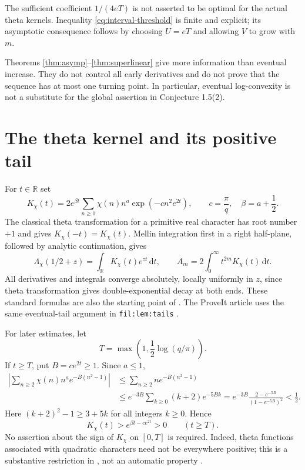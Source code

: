 \documentclass[11pt]{article}
\newcommand{\dd}{\,\mathrm d}
\newcommand{\R}{\mathbb R}
\begin{document}
The sufficient coefficient $1/(4eT)$ is not asserted to be optimal for the actual theta kernels. Inequality \eqref{eq:interval-threshold} is finite and explicit; its asymptotic consequence follows by choosing $U=eT$ and allowing $V$ to grow with $m$.

Theorems \ref{thm:asymp}--\ref{thm:superlinear} give more information than eventual increase. They do not control all early derivatives and do not prove that the sequence has at most one turning point. In particular, eventual log-convexity is not a substitute for the global assertion in Conjecture 1.5(2).

\section{The theta kernel and its positive tail}
For $t\in\R$ set
\[
 K_\chi(t)=2e^{\beta t}\sum_{n\ge1}\chi(n)n^a
 \exp\!\left(-c n^2e^{2t}\right),
 \qquad c=\frac\pi q,\quad\beta=a+\frac12.
\]
The classical theta transformation for a primitive real character has root number $+1$ and gives $K_\chi(-t)=K_\chi(t)$. Mellin integration first in a right half-plane, followed by analytic continuation, gives
\begin{equation}\label{eq:kernel}
 \Lambda_\chi(1/2+z)=\int_{\R}K_\chi(t)e^{zt}\dd t,
 \qquad
 A_m=2\int_0^\infty t^{2m}K_\chi(t)\dd t.
\end{equation}
All derivatives and integrals converge absolutely, locally uniformly in $z$, since theta transformation gives double-exponential decay at both ends. These standard formulas are also the starting point of \cite{SV}. The ProveIt article uses the same eventual-tail argument in \texttt{fil:lem:tails} \cite{ProveIt}.

For later estimates, let
\[
 T=\max\left(1,\frac12\log(q/\pi)\right).
\]
If $t\ge T$, put $B=ce^{2t}\ge1$. Since $a\le1$,
\begin{align*}
 \left|\sum_{n\ge2}\chi(n)n^a e^{-B(n^2-1)}\right|
 &\le\sum_{n\ge2}n e^{-B(n^2-1)}\\
 &\le e^{-3B}\sum_{k\ge0}(k+2)e^{-5Bk}
 =e^{-3B}\frac{2-e^{-5B}}{(1-e^{-5B})^2}<\frac12.
\end{align*}
Here $(k+2)^2-1\ge3+5k$ for all integers $k\ge0$. Hence
\begin{equation}\label{eq:positive-tail}
 K_\chi(t)>e^{\beta t-ce^{2t}}>0\qquad(t\ge T).
\end{equation}
No assertion about the sign of $K_\chi$ on $[0,T]$ is required. Indeed, theta functions associated with quadratic characters need not be everywhere positive; this is a substantive restriction in \cite{SV}, not an automatic property \cite{LM}.
\end{document}
